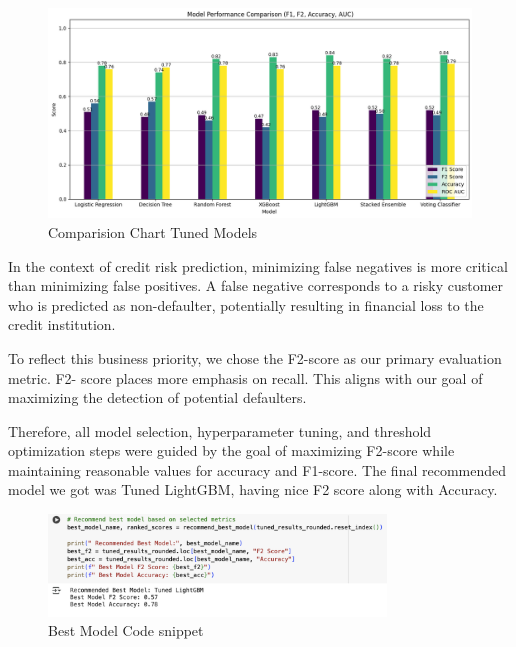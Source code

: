 \documentclass[12pt,a4paper]{article}
\begin{document}
\begin{figure}[H]
    \centering
    \includegraphics[width=1\textwidth]{figures/18.png}
    \caption{Comparision Chart Tuned Models}
\end{figure}




In the context of credit risk prediction, minimizing false negatives is more critical than minimizing
false positives. A false negative corresponds to a risky customer who is predicted as non-defaulter,
potentially resulting in financial loss to the credit institution.

To reflect this business priority, we chose the F2-score as our primary evaluation metric. F2-
score places more emphasis on recall. This aligns with our goal of maximizing the detection of
potential defaulters.

Therefore, all model selection, hyperparameter tuning, and threshold optimization steps were
guided by the goal of maximizing F2-score while maintaining reasonable values for accuracy and
F1-score.
The final recommended model we got was Tuned LightGBM, having nice F2 score along with
Accuracy.

\begin{figure}[H]
    \centering
    \includegraphics[width=0.8\textwidth]{figures/19.png}
    \caption{Best Model Code snippet}
\end{figure}
\end{document}
